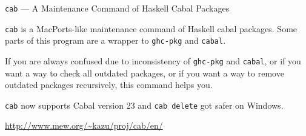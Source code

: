 \begin{hcarentry}[updated]{{\tt cab} --- A Maintenance Command of Haskell Cabal Packages}
\makeheader

{\tt cab} is a MacPorts-like maintenance command of Haskell cabal packages. Some parts of this program are a wrapper to {\tt ghc-pkg} and {\tt cabal}.

If you are always confused due to inconsistency of {\tt ghc-pkg} and {\tt cabal}, or if you want a way to check all outdated packages, or if you want a way to remove outdated packages recursively, this command helps you.

{\tt cab} now supports Cabal version 23 and {\tt cab delete} got safer on Windows.

\FurtherReading
  \url{http://www.mew.org/~kazu/proj/cab/en/}
\end{hcarentry}
